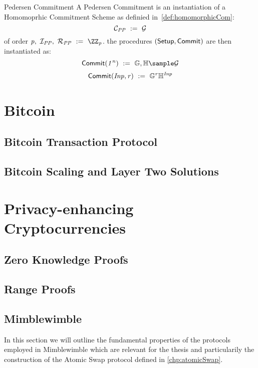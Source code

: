 \begin{definition}{Pedersen Commitment}\label{def:pedersenCom}
    A Pedersen Commitment is an instantiation of a Homomoprhic Commitment Scheme as definied in~\ref{def:homomorphicCom}:
    \[ \mathcal{C}_{\mathit{PP}} ~:=~ \mathcal{G}\] of order $\varPrime \opSeperate \varInputSpace_{\varPublicParam} \opSeperate \varRandSpace_{\varPublicParam} \opAssign \cnstIntegersPrime{\varPrime}$.
    the procedures $(\mathsf{Setup}, \mathsf{Commit})$ are then instantiated as:
    \[ \procSetup{\varSecParam} \opAssign \varG, \varH \sample \cnstGroup\]
    \[ \mathsf{Commit}(\mathit{Inp}, \mathit{r}) ~:=~ \mathbb{G}^{\mathit{r}} \mathbb{H}^{\mathit{Inp}} \]

\end{definition}


\section{Bitcoin}\label{sec:bitcoin}

\subsection{Bitcoin Transaction Protocol}\label{sec:bitcoinTx}

\subsection{Bitcoin Scaling and Layer Two Solutions}\label{sec:bitcoinScaling}


\section{Privacy-enhancing Cryptocurrencies}\label{sec:privacyCryptos}

\subsection{Zero Knowledge Proofs}\label{sec:zeroKnowlegde}

\subsection{Range Proofs}\label{sec:rangeProof}

\subsection{Mimblewimble}\label{sec:Mimblewimble}
In this section we will outline the fundamental properties of the protocols employed in Mimblewimble which are relevant for the thesis and particularily the construction of the Atomic Swap protocol defined in
\ref{chp:atomicSwap}.
